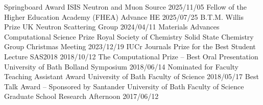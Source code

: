 \begin{dayenumerate}
  \cvaward
    {Springboard Award}
    {ISIS Neutron and Muon Source}
    {2025/11/05}
  \cvaward
    {Fellow of the Higher Education Academy (FHEA)}
    {Advance HE}
    {2025/07/25}
  \cvaward
    {B.T.M. Willis Prize}
    {UK Neutron Scattering Group}
    {2024/04/11}
  \cvaward
    {Materials Advances Computational Science Prize}
    {Royal Society of Chemistry Solid State Chemistry Group Christmas Meeting}
    {2023/12/19}
  \cvaward
    {IUCr Journals Prize for the Best Student Lecture}
    {SAS2018}
    {2018/10/12}
  \cvaward
    {The Computational Prize -- Best Oral Presentation}
    {University of Bath Bolland Symposium}
    {2018/06/14}
  \cvaward
    {Nominated for Faculty Teaching Assistant Award}
    {University of Bath Faculty of Science}
    {2018/05/17}
  \cvaward
    {Best Talk Award -- Sponsored by Santander}
    {University of Bath Faculty of Science Graduate School Research Afternoon}
    {2017/06/12}
\end{dayenumerate}
